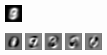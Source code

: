 \documentclass{revtex4-1}
\begin{document}
\begin{figure}
\begin{subfigure}{.15\linewidth}
    \caption{}
    \label{fig:vbias}
  \end{subfigure}
  \begin{subfigure}{.15\linewidth}
    \includegraphics[width=\linewidth]{X_l_eigv_1.png}
    \caption{}
    \label{fig:m1data}
  \end{subfigure}\par\medskip
  \begin{subfigure}{\linewidth}
    \includegraphics[width=.05\linewidth]{X_l_eigv_2.png}
    \includegraphics[width=.05\linewidth]{X_l_eigv_3.png}
    \includegraphics[width=.05\linewidth]{X_l_eigv_4.png}
    \includegraphics[width=.05\linewidth]{X_l_eigv_5.png}
    \includegraphics[width=.05\linewidth]{X_l_eigv_6.png}

\end{subfigure}
\end{figure}
\end{document}
